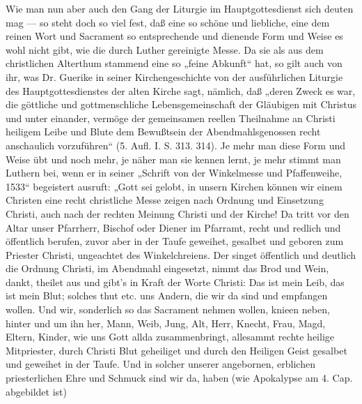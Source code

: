Wie man nun aber auch den Gang der Liturgie im Hauptgottesdienst sich deuten mag — so steht doch so viel fest, daß eine so schöne und liebliche, eine dem reinen Wort und Sacrament so entsprechende und dienende Form und Weise es wohl nicht gibt, wie die durch Luther gereinigte Messe. Da sie als aus dem christlichen Alterthum stammend eine so „feine Abkunft“ hat, so gilt auch von ihr, was Dr. Guerike in seiner Kirchengeschichte von der ausführlichen Liturgie des Hauptgottesdienstes der alten Kirche sagt, nämlich, daß „deren Zweck es war, die göttliche und gottmenschliche Lebensgemeinschaft der Gläubigen mit Christus und unter einander, vermöge der gemeinsamen reellen Theilnahme an Christi heiligem Leibe und Blute dem Bewußtsein der Abendmahlsgenossen recht anschaulich vorzuführen“ (5. Aufl. I. S. 313. 314). Je mehr man diese Form und Weise übt und noch mehr, je näher man sie kennen lernt, je mehr stimmt man Luthern bei, wenn er in seiner „Schrift von der Winkelmesse und Pfaffenweihe, 1533“ begeistert ausruft: „Gott sei gelobt, in unsern Kirchen können wir einem Christen eine recht christliche Messe zeigen nach Ordnung und Einsetzung Christi, auch nach der rechten Meinung Christi und der Kirche! Da tritt vor den Altar unser Pfarrherr, Bischof oder Diener im Pfarramt, recht und redlich und öffentlich berufen, zuvor aber in der Taufe geweihet, gesalbet und geboren zum Priester Christi, ungeachtet des Winkelchreiens. Der singet öffentlich und deutlich die Ordnung Christi, im Abendmahl eingesetzt, nimmt das Brod und Wein, dankt, theilet aus und gibt’s in Kraft der Worte Christi: Das ist mein Leib, das ist mein Blut; solches thut etc. uns Andern, die wir da sind und empfangen wollen. Und wir, sonderlich so das Sacrament nehmen wollen, knieen neben, hinter und um ihn her, Mann, Weib, Jung, Alt, Herr, Knecht, Frau, Magd, Eltern, Kinder, wie uns Gott allda zusammenbringt, allesammt rechte heilige Mitpriester, durch Christi Blut geheiliget und durch den Heiligen Geist gesalbet und geweihet in der Taufe. Und in solcher unserer angebornen, erblichen priesterlichen Ehre und Schmuck sind wir da, haben (wie Apokalypse am 4. Cap. abgebildet ist)
